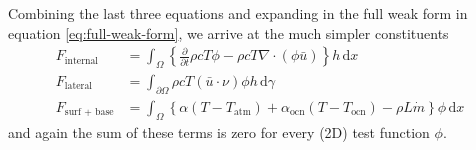 \documentclass{article}
\theoremstyle{definition}
\theoremstyle{plain}
\newcommand{\ud}{\hspace{2pt}\mathrm{d}}
\begin{document}
Combining the last three equations and expanding in the full weak form in equation \eqref{eq:full-weak-form}, we arrive at the much simpler constituents
\begin{align}
    F_{\text{internal}} & = \int_\Omega\left\{\frac{\partial}{\partial t}\rho cT\phi - \rho cT\nabla\cdot(\phi\bar u)\right\}h\ud x \\
    F_{\text{lateral}} & = \int_{\partial\Omega}\rho cT(\bar u\cdot\nu)\phi h\ud\gamma \\
    F_{\text{surf + base}} & = \int_\Omega\left\{\alpha(T - T_{\text{atm}}) + \alpha_{\text{ocn}}(T - T_{\text{ocn}}) - \rho L\dot m\right\}\phi\ud x
\end{align}
and again the sum of these terms is zero for every (2D) test function $\phi$.

\pagebreak



\end{document}
